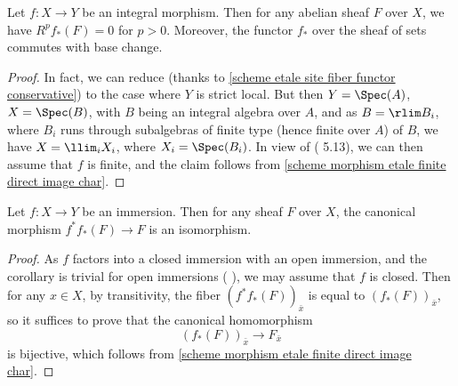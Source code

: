 \begin{corollary}\label{scheme morphism etale integral direct image vanish}
Let $f:X\to Y$ be an integral morphism. Then for any abelian sheaf $F$ over $X$, we have $R^pf_*(F)=0$ for $p>0$. Moreover, the functor $f_*$ over the sheaf of sets commutes with base change.
\end{corollary}
\begin{proof}
In fact, we can reduce (thanks to \cref{scheme etale site fiber functor conservative}) to the case where $Y$ is strict local. But then $Y=\Spec(A)$, $X=\Spec(B)$, with $B$ being an integral algebra over $A$, and as $B=\rlim B_i$, where $B_i$ runs through subalgebras of finite type (hence finite over $A$) of $B$, we have $X=\llim_iX_i$, where $X_i=\Spec(B_i)$. In view of (\cite{SGA4-2}  5.13), we can then assume that $f$ is finite, and the claim follows from \ref{scheme morphism etale finite direct image char}.
\end{proof}

\begin{corollary}\label{scheme immersion etale pushpull isomorphism}
Let $f:X\to Y$ be an immersion. Then for any sheaf $F$ over $X$, the canonical morphism $f^*f_*(F)\to F$ is an isomorphism.
\end{corollary}
\begin{proof}
As $f$ factors into a closed immersion with an open immersion, and the corollary is trivial for open immersions (\cite{SGA4-1} ), we may assume that $f$ is closed. Then for any $x\in X$, by transitivity, the fiber $(f^*f_*(F))_{\bar{x}}$ is equal to $(f_*(F))_{\bar{x}}$, so it suffices to prove that the canonical homomorphism
\[(f_*(F))_{\bar{x}}\to F_{\bar{x}}\]
is bijective, which follows from \cref{scheme morphism etale finite direct image char}.
\end{proof}

